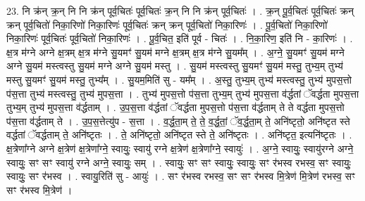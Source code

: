 \documentclass[17pt]{extarticle}
\begin{document}
23. नि क्र॑न् क्र॒न् नि नि क्र॑न् पूर्व॒चितः॑ पूर्व॒चितः॑ क्र॒न् नि नि क्र॑न् पूर्व॒चितः॑ । . क्र॒न् पू॒र्व॒चितः॑ पूर्व॒चितः॑ क्रन् क्रन् पूर्व॒चितो॑ निका॒रिणो॑ निका॒रिणः॑ पूर्व॒चितः॑ क्रन् क्रन् पूर्व॒चितो॑ निका॒रिणः॑ । . पू॒र्व॒चितो॑ निका॒रिणो॑ निका॒रिणः॑ पूर्व॒चितः॑ पूर्व॒चितो॑ निका॒रिणः॑ । . पू॒र्व॒चित॒ इति॑ पूर्व - चितः॑ । . नि॒का॒रिण॒ इति॑ नि - का॒रिणः॑ । . क्ष॒त्र म॑ग्ने अग्ने क्ष॒त्रम् क्ष॒त्र म॑ग्ने सु॒यमꣳ॑ सु॒यम॑ मग्ने क्ष॒त्रम् क्ष॒त्र म॑ग्ने सु॒यम᳚म् । . अ॒ग्ने॒ सु॒यमꣳ॑ सु॒यम॑ मग्ने अग्ने सु॒यम॑ मस्त्वस्तु सु॒यम॑ मग्ने अग्ने सु॒यम॑ मस्तु । . सु॒यम॑ मस्त्वस्तु सु॒यमꣳ॑ सु॒यम॑ मस्तु॒ तुभ्य॒म् तुभ्य॑ मस्तु सु॒यमꣳ॑ सु॒यम॑ मस्तु॒ तुभ्य᳚म् । . सु॒यम॒मिति॑ सु - यम᳚म् । . अ॒स्तु॒ तुभ्य॒म् तुभ्य॑ मस्त्वस्तु॒ तुभ्य॑ मुपस॒त्तो प॑स॒त्ता तुभ्य॑ मस्त्वस्तु॒ तुभ्य॑ मुपस॒त्ता । . तुभ्य॑ मुपस॒त्तो प॑स॒त्ता तुभ्य॒म् तुभ्य॑ मुपस॒त्ता व॑र्द्धतां ॅवर्द्धता मुपस॒त्ता तुभ्य॒म् तुभ्य॑ मुपस॒त्ता व॑र्द्धताम् । . उ॒प॒स॒त्ता व॑र्द्धतां ॅवर्द्धता मुपस॒त्तो प॑स॒त्ता व॑र्द्धताम् ते ते वर्द्धता मुपस॒त्तो प॑स॒त्ता व॑र्द्धताम् ते । . उ॒प॒स॒त्तेत्यु॑प - स॒त्ता । . व॒र्द्ध॒ता॒म् ते॒ ते॒ व॒र्द्ध॒तां॒ ॅव॒र्द्ध॒ता॒म् ते॒ अनि॑ष्टृतो॒ अनि॑ष्टृत स्ते वर्द्धतां ॅवर्द्धताम् ते॒ अनि॑ष्टृतः । . ते॒ अनि॑ष्टृतो॒ अनि॑ष्टृत स्ते ते॒ अनि॑ष्टृतः । . अनि॑ष्टृत॒ इत्यनि॑ष्टृतः । . क्ष॒त्रेणा᳚ग्ने अग्ने क्ष॒त्रेण॑ क्ष॒त्रेणा᳚ग्ने॒ स्वायुः॒ स्वायु॑ रग्ने क्ष॒त्रेण॑ क्ष॒त्रेणा᳚ग्ने॒ स्वायुः॑ । . अ॒ग्ने॒ स्वायुः॒ स्वायु॑रग्ने अग्ने॒ स्वायुः॒ सꣳ सꣳ स्वायु॑ रग्ने अग्ने॒ स्वायुः॒ सम् । . स्वायुः॒ सꣳ सꣳ स्वायुः॒ स्वायुः॒ सꣳ र॑भस्व रभस्व॒ सꣳ स्वायुः॒ स्वायुः॒ सꣳ र॑भस्व । . स्वायु॒रिति॑ सु - आयुः॑ । . सꣳ र॑भस्व रभस्व॒ सꣳ सꣳ र॑भस्व मि॒त्रेण॑ मि॒त्रेण॑ रभस्व॒ सꣳ सꣳ र॑भस्व मि॒त्रेण॑ । \newline
\end{document}
